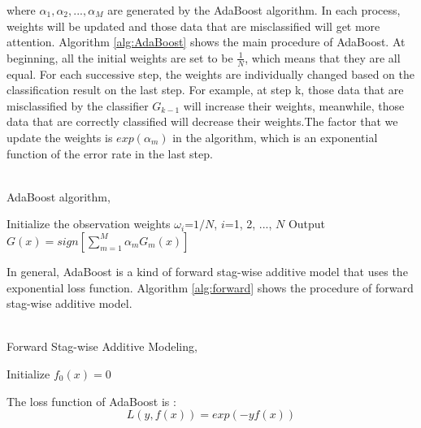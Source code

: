 where $\alpha_1, \alpha_2, ..., \alpha_M$ are generated by the AdaBoost algorithm. In each process,  weights will be updated and those data that are misclassified will get more attention. Algorithm \ref{alg:AdaBoost} shows the main procedure of AdaBoost.
At beginning,  all the initial weights are set to be $\frac{1}{N}$,  which means that they are all equal. For each successive step,  the weights are individually changed based on the classification result on the last step. For example,  at step k,  those data that are misclassified by the classifier $G_{k-1}$ will increase their weights, meanwhile, those data that are correctly classified will decrease their weights.The factor that we update the weights is $exp(\alpha_m)$ in the algorithm,  which is an exponential function of the error rate in the last step.\\
\\
\begin{algorithm}[H]
	\caption{AdaBoost algorithm,  \cite{friedman2001elements}}\label{alg:AdaBoost}
	\nl Initialize the observation weights $\omega_i$=$1/N$, $i$=1, 2, ..., $N$\;
	\nl {}
	\nl Output $G(x)=sign[\sum_{m=1}^{M}\alpha_m G_m(x)]$ \;
\end{algorithm}
In general,  AdaBoost is a kind of forward stag-wise additive model that uses the exponential loss function. Algorithm \ref{alg:forward} shows the procedure of forward stag-wise additive model. \\
\\
\begin{algorithm}[H]
	\caption{Forward Stag-wise Additive Modeling,  \cite{friedman2001elements}}\label{alg:forward}\label{alg:forward}
	\nl Initialize $f_0(x)=0$\;
	\nl {}
\end{algorithm}

The loss function of AdaBoost is :
\begin{equation}\label{en:loss}
L(y, f(x))=exp(-yf(x))
\end{equation}

